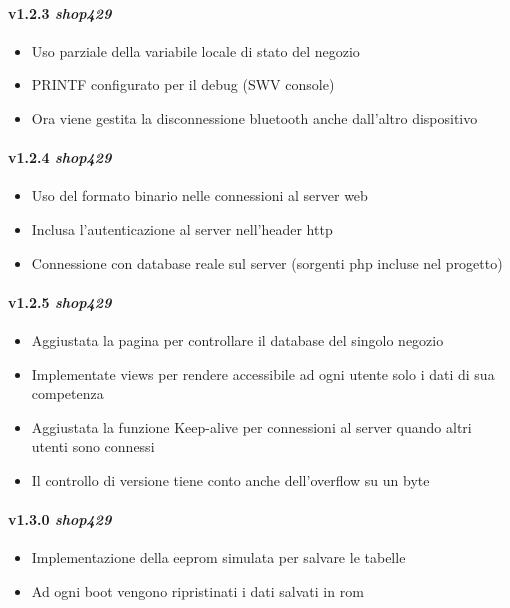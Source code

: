 \paragraph{v1.2.3 \textit{shop429}}
	\begin{itemize}
		\item Uso parziale della variabile locale di stato del negozio
		\item PRINTF configurato per il debug (SWV console)
		\item Ora viene gestita la disconnessione bluetooth anche dall'altro dispositivo
	\end{itemize}
\paragraph{v1.2.4 \textit{shop429}}
	\begin{itemize}
		\item Uso del formato binario nelle connessioni al server web
		\item Inclusa l'autenticazione al server nell'header http
		\item Connessione con database reale sul server (sorgenti php incluse nel progetto)
	\end{itemize}
\paragraph{v1.2.5 \textit{shop429}}
  \begin{itemize}
  	\item Aggiustata la pagina per controllare il database del singolo negozio
    \item Implementate views per rendere accessibile ad ogni utente solo i dati di sua competenza
    \item Aggiustata la funzione Keep-alive per connessioni al server quando altri utenti sono connessi
    \item Il controllo di versione tiene conto anche dell'overflow su un byte
  \end{itemize}
\paragraph{v1.3.0 \textit{shop429}}
  \begin{itemize}
  	\item Implementazione della eeprom simulata per salvare le tabelle
    \item Ad ogni boot vengono ripristinati i dati salvati in rom
  \end{itemize}
